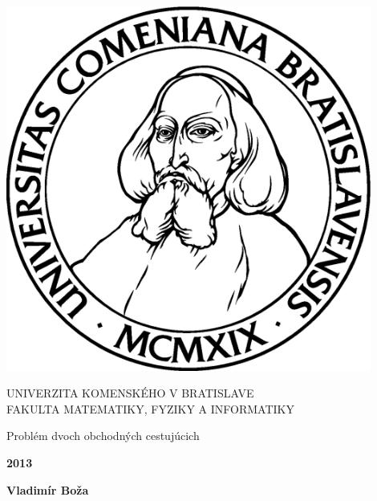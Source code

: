 \documentclass[12pt,a4paper]{book}
\begin{document}
\thispagestyle{empty}
\begin{minipage}{0.25\textwidth}
\includegraphics[width=0.9\textwidth]{img/komlogo-new}
\end{minipage}
\begin{minipage}{0.69\textwidth}
\begin{center}
UNIVERZITA KOMENSKÉHO V BRATISLAVE \\
FAKULTA MATEMATIKY, FYZIKY A INFORMATIKY \\
\end{center}
\end{minipage}

\bigskip

\vfill
\begin{center}
\begin{minipage}{0.8\textwidth}
\bigskip\medskip
\centerline{\LARGE\sc Problém dvoch obchodných cestujúcich}
\end{minipage}
\end{center}
\vfill
{\bf 2013}

\hfill{\bf Vladimír Boža}
\eject %
\end{document}

